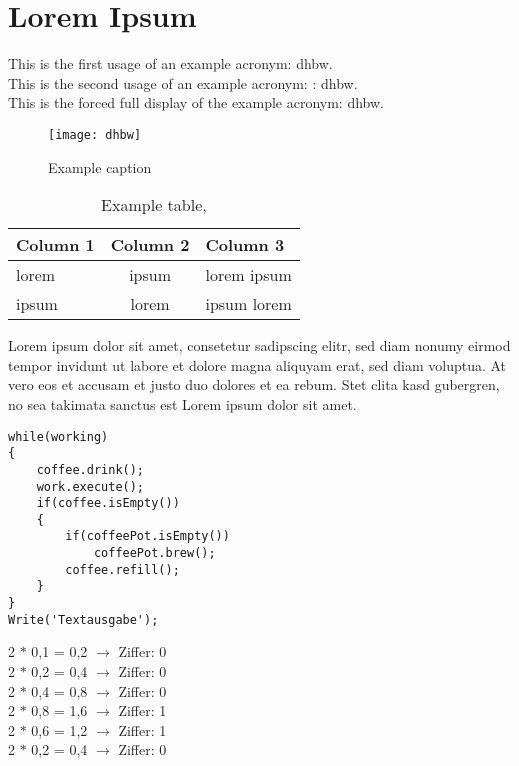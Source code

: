 \chapter{Lorem Ipsum}\label{ch:lorem-ipsum}
This is the first usage of an example acronym: \ac{dhbw}.\\
This is the second usage of an example acronym: : \ac{dhbw}.\\
This is the forced full display of the example acronym: \acf{dhbw}.

\begin{figure}[h]
    \centering
    \texttt{[image: dhbw]}
    \caption{Example caption}\label{fig:figure}
\end{figure}


\begin{table}[htbp]         %
    \begin{tabular}{lcl}        %
        \hline                  %
        \textbf{Column 1} & \textbf{Column 2} & \textbf{Column 3} \\ \hline    %
        lorem             & ipsum             & lorem ipsum       \\
        ipsum             & lorem             & ipsum lorem
    \end{tabular}
    \label{tablename}
    \caption{Example table, \cite{lorem}}
\end{table}

Lorem ipsum dolor sit amet, consetetur sadipscing elitr, sed diam nonumy eirmod tempor invidunt ut labore et dolore magna aliquyam erat, sed diam voluptua. At vero eos et accusam et justo duo dolores et ea rebum. Stet clita kasd gubergren, no sea takimata sanctus est Lorem ipsum dolor sit amet. \cite{lorem}

\newpage
\begin{lstlisting}[caption=This is a listing,label=lst:code]
while(working)
{
    coffee.drink();
    work.execute();
    if(coffee.isEmpty())
    {
        if(coffeePot.isEmpty())
            coffeePot.brew();
        coffee.refill();
    }
}
Write('Textausgabe');
\end{lstlisting}


\begin{center}
    2 $\ast$ 0,1 = 0,2 $\rightarrow$ Ziffer: 0 \\
    2 $\ast$ 0,2 = 0,4 $\rightarrow$ Ziffer: 0 \\
    2 $\ast$ 0,4 = 0,8 $\rightarrow$ Ziffer: 0 \\
    2 $\ast$ 0,8 = 1,6 $\rightarrow$ Ziffer: 1 \\
    2 $\ast$ 0,6 = 1,2 $\rightarrow$ Ziffer: 1 \\
    2 $\ast$ 0,2 = 0,4 $\rightarrow$ Ziffer: 0 \\
\end{center}


